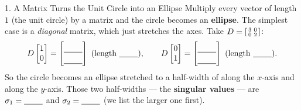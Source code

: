 \documentclass[10pt]{article}
\begin{document}
\begin{notesbox}{1. A Matrix Turns the Unit Circle into an Ellipse}
Multiply every vector of length $1$ (the unit circle) by a matrix and the circle becomes an
\textbf{ellipse}. The simplest case is a \emph{diagonal} matrix, which just stretches the axes. Take
$D=\begin{bsmallmatrix} 3 & 0\\ 0 & 2 \end{bsmallmatrix}$:
\[
  D\begin{bmatrix} 1\\ 0 \end{bmatrix}=\begin{bmatrix}\rule{0pt}{1.1em}\blank{0.8cm}\\[2pt]\blank{0.8cm}\end{bmatrix}
  \ (\text{length }\blank{0.8cm}),\qquad
  D\begin{bmatrix} 0\\ 1 \end{bmatrix}=\begin{bmatrix}\rule{0pt}{1.1em}\blank{0.8cm}\\[2pt]\blank{0.8cm}\end{bmatrix}
  \ (\text{length }\blank{0.8cm}).
\]
So the circle becomes an ellipse stretched to a half-width of \blank{0.8cm} along the $x$-axis and
\blank{0.8cm} along the $y$-axis. Those two half-widths --- the \textbf{singular values} --- are
$\sigma_1=\blank{0.8cm}$ and $\sigma_2=\blank{0.8cm}$ (we list the larger one first).
\end{notesbox}
\end{document}
